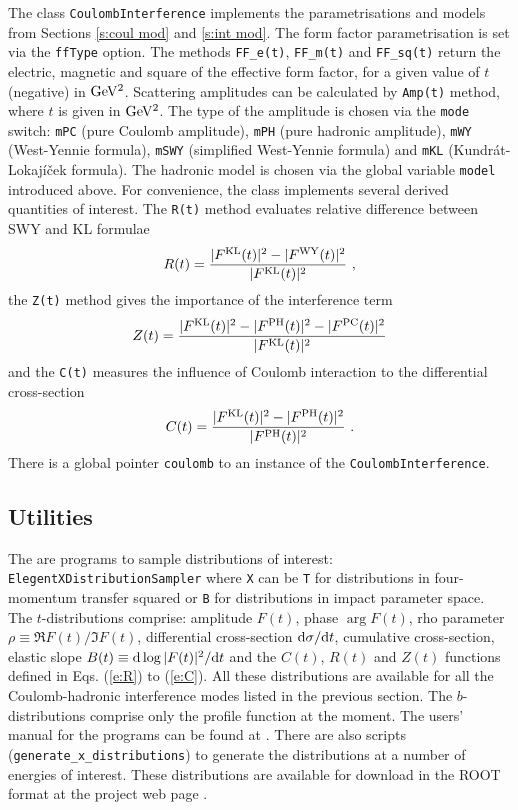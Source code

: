 \documentclass[preprint,12pt]{elsarticle}
\def\d{{\rm d}}
\begin{document}
The class {\tt CoulombInterference} implements the parametrisations and models from Sections \ref{s:coul mod} and \ref{s:int mod}. The form factor parametrisation is set via the {\tt ffType} option. The methods {\tt FF\_e(t)}, {\tt FF\_m(t)} and {\tt FF\_sq(t)} return the electric, magnetic and square of the effective form factor, for a given value of $t$ (negative) in $\rm GeV^2$. Scattering amplitudes can be calculated by {\tt Amp(t)} method, where $t$ is given in $\rm GeV^2$. The type of the amplitude is chosen via the {\tt mode} switch: {\tt mPC} (pure Coulomb amplitude), {\tt mPH} (pure hadronic amplitude), {\tt mWY} (West-Yennie formula), {\tt mSWY} (simplified West-Yennie formula) and {\tt mKL} (Kundr\'at-Lokaj\' i\v cek formula). The hadronic model is chosen via the global variable {\tt model} introduced above. For convenience, the class implements several derived quantities of interest. The {\tt R(t)} method evaluates relative difference between SWY and KL formulae
\begin{equation}\label{e:R}
R(t) = {|F^{\rm KL}(t)|^2 - |F^{\rm WY}(t)|^2 \over |F^{\rm KL}(t)|^2}\ ,
\end{equation}
the {\tt Z(t)} method gives the importance of the interference term
\begin{equation}\label{e:Z}
Z(t) = {|F^{\rm KL}(t)|^2 - |F^{\rm PH}(t)|^2 - |F^{\rm PC}(t)|^2 \over |F^{\rm KL}(t)|^2}
\end{equation}
and the {\tt C(t)} measures the influence of Coulomb interaction to the differential cross-section
\begin{equation}\label{e:C}
C(t) = {|F^{\rm KL}(t)|^2 - |F^{\rm PH}(t)|^2 \over |F^{\rm PH}(t)|^2} \ .
\end{equation}
There is a global pointer {\tt coulomb} to an instance of the {\tt CoulombInterference}.


\subsection{Utilities}\label{s:prog util}

The are programs to sample distributions of interest: {\tt ElegentXDistributionSampler} where {\tt X} can be {\tt T} for distributions in four-momentum transfer squared or {\tt B} for distributions in impact parameter space. The $t$-distributions comprise: amplitude $F(t)$, phase $\arg F(t)$, rho parameter $\rho \equiv \Re F(t)/\Im F(t)$, differential cross-section $\d\sigma/\d t$, cumulative cross-section, elastic slope $B(t) \equiv \d\log |F(t)|^2/\d t$ and the $C(t)$, $R(t)$ and $Z(t)$ functions defined in Eqs. (\ref{e:R}) to (\ref{e:C}). All these distributions are available for all the Coulomb-hadronic interference modes listed in the previous section. The $b$-distributions comprise only the profile function at the moment. The users' manual for the programs can be found at \cite[Wiki section]{elegent}. There are also scripts ({\tt generate\_x\_distributions}) to generate the distributions at a number of energies of interest. These distributions are available for download in the ROOT format at the project web page \cite[Data-sheets section]{elegent}.
\end{document}
